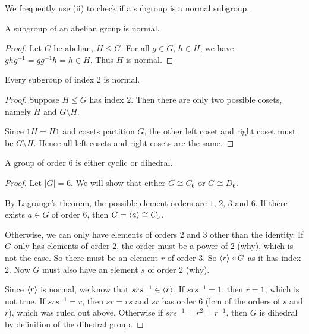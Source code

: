 \begin{remark}
We frequently use (ii) to check if a subgroup is a normal subgroup.
\end{remark}

\begin{lemma}\label{lemma:subgroup-of-abelian-group-is-normal}
A subgroup of an abelian group is normal.
\end{lemma}

\begin{proof}
Let $G$ be abelian, $H\le G$. 
For all $g\in G$, $h\in H$, we have $ghg^{-1}=gg^{-1}h=h\in H$. 
Thus $H$ is normal.
\end{proof}

\begin{lemma}
Every subgroup of index $2$ is normal.
\end{lemma}

\begin{proof}
Suppose $H\le G$ has index $2$. Then there are only two possible cosets, namely $H$ and $G\setminus H$.

Since $1H=H1$ and cosets partition $G$, the other left coset and right coset must be $G\setminus H$. Hence all left cosets and right cosets are the same.
\end{proof}

\begin{proposition}
A group of order $6$ is either cyclic or dihedral.
\end{proposition}

\begin{proof}
Let $|G|=6$. We will show that either $G\cong C_6$ or $G\cong D_6$.

By Lagrange's theorem, the possible element orders are $1$, $2$, $3$ and $6$. If there exists $a\in G$ of order $6$, then $G=\left\langle a\right\rangle\cong C_6$. 

Otherwise, we can only have elements of orders $2$ and $3$ other than the identity. If $G$ only has elements of order $2$, the order must be a power of $2$ (why), which is not the case.
So there must be an element $r$ of order $3$. So $\left\langle r\right\rangle\triangleleft G$ as it has index $2$. Now $G$ must also have an element $s$ of order $2$ (why).

Since $\left\langle r\right\rangle$ is normal, we know that $srs^{-1}\in\left\langle r\right\rangle$. If $srs^{-1}=1$, then $r=1$, which is not true. If $srs^{-1}=r$, then $sr=rs$ and $sr$ has order $6$ (lcm of the orders of $s$ and $r$), which was ruled out above. Otherwise if $srs^{-1}=r^2=r^{-1}$, then $G$ is dihedral by definition of the dihedral group.
\end{proof}

